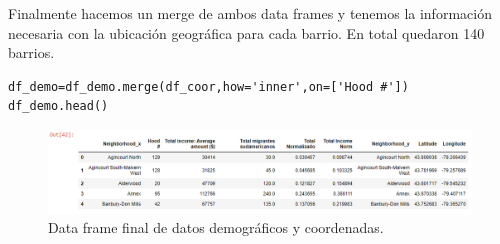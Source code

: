 \documentclass[10pt,a4paper,arial, spanish]{article}
\begin{document}
Finalmente hacemos un merge de ambos data frames y tenemos la información necesaria con la ubicación geográfica para cada barrio. En total quedaron 140 barrios.
\begin{verbatim}
df_demo=df_demo.merge(df_coor,how='inner',on=['Hood #'])
df_demo.head()
\end{verbatim}
\begin{figure}[h]
	\centering
	\includegraphics[scale=0.4]{df5}
	\caption[Data frame final de datos demográficos y coordenadas.]{Data frame final de datos demográficos y coordenadas.}
	\label{fig:df5}
\end{figure}
\end{document}
